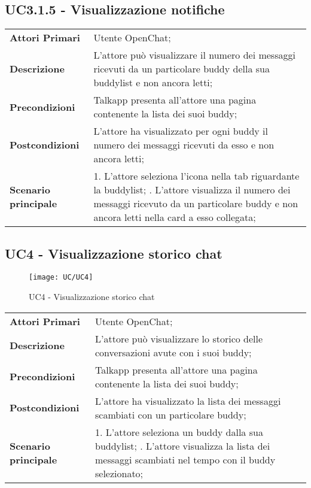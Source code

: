 \subsection{UC3.1.5 - Visualizzazione notifiche}
	\begin{center}
		\bgroup
		\def\arraystretch{1.8}     
		\begin{longtable}{  p{4cm} | p{9.5cm} } 
			\textbf{Attori Primari} & Utente OpenChat; \\ 
			\textbf{Descrizione} &  L'attore può visualizzare il numero dei messaggi ricevuti da un particolare buddy della sua buddylist e non ancora letti; \\ 
			\textbf{Precondizioni}  & Talkapp presenta all'attore una pagina contenente la lista dei suoi buddy; \\
			\textbf{Postcondizioni} & L'attore ha visualizzato per ogni buddy il numero dei messaggi ricevuti da esso e non ancora letti;  \\ 
			\textbf{Scenario principale} & 
			1. L'attore seleziona l'icona nella tab riguardante la buddylist; \newline
			2. L'attore visualizza il numero dei messaggi ricevuto da un particolare buddy e non ancora letti nella card a esso collegata;
		\end{longtable}
		\egroup
	\end{center}


\subsection{UC4 - Visualizzazione storico chat}
	\begin{figure}[H] 
	\centering
	\texttt{[image: UC/UC4]}
	\caption{UC4 - Visualizzazione storico chat}
\end{figure}
	\begin{center}
	\bgroup
	\def\arraystretch{1.8}     
	\begin{longtable}{  p{4cm} | p{9.5cm} } 
		\textbf{Attori Primari} & Utente OpenChat; \\ 
		\textbf{Descrizione} &  L'attore può visualizzare lo storico delle conversazioni avute con i suoi buddy; \\ 
		\textbf{Precondizioni}  & Talkapp presenta all'attore una pagina contenente la lista dei suoi buddy; \\
		\textbf{Postcondizioni} & L'attore ha visualizzato la lista dei messaggi scambiati con un particolare buddy;  \\ 
		\textbf{Scenario principale} & 
		1. L'attore seleziona un buddy dalla sua buddylist; \newline
		2. L'attore visualizza la lista dei messaggi scambiati nel tempo con il buddy selezionato;
	\end{longtable}
	\egroup
\end{center}

